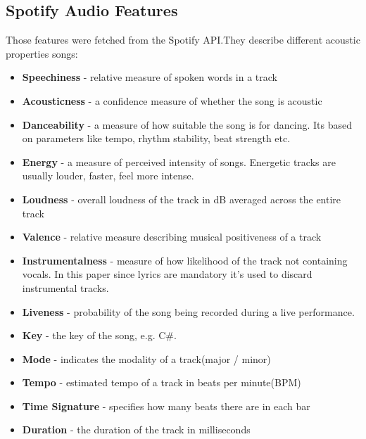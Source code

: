 \subsection{Spotify Audio Features}
\label{sec:spotifyaudiofeatures}
Those features were fetched from the Spotify API.They describe different
acoustic properties songs:
\begin{itemize}
  \item \textbf{Speechiness} - relative measure of spoken words in a track
  \item \textbf{Acousticness} - a confidence measure of whether the song is
    acoustic
  \item \textbf{Danceability} - a measure of how suitable the song is for
    dancing. Its based on parameters like tempo, rhythm stability, beat
    strength etc.
  \item \textbf{Energy} - a measure of perceived intensity of songs. Energetic
    tracks are usually louder, faster, feel more intense.
  \item \textbf{Loudness} - overall loudness of the  track in dB averaged
    across the entire track
  \item \textbf{Valence} - relative measure describing musical positiveness of
    a track
  \item \textbf{Instrumentalness} - measure of how likelihood of the track not
    containing vocals. In this paper since lyrics are mandatory it's used to
    discard instrumental tracks.
  \item \textbf{Liveness} - probability of the song being recorded during a
    live performance.
  \item \textbf{Key} - the key of the song, e.g. C\#.
  \item \textbf{Mode} - indicates the modality of a track(major / minor)
  \item \textbf{Tempo} - estimated tempo of a track in beats per minute(BPM)
  \item \textbf{Time Signature} - specifies how many beats there are in each
    bar
  \item \textbf{Duration} - the duration of the track in milliseconds
\end{itemize}


